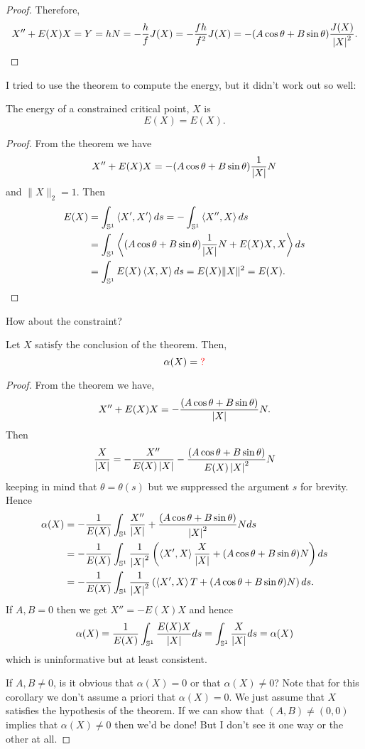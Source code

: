 \documentclass[12pt]{article}
\begin{document}
\begin{proof}
Therefore,
\[
X'' + E(X) X = Y = hN = -\frac{h}{f} J(X) = -\frac{fh}{f^2} J(X) = -(A \cos\theta + B \sin\theta) \frac{J(X)}{\left|{X}\right|^2}.
\]
\end{proof}

{\color{red} I tried to use the theorem to compute the energy, but it didn't work out so well:}

\begin{cor}
The energy of a constrained critical point, \(X\) is
\[
E(X) = E(X).
\]
\end{cor}

\begin{proof}
From the theorem we have
\[
X'' + E(X) X = -(A \cos\theta + B \sin\theta) \frac{1}{\left|{X}\right|} N
\]
and \(\|X\|_2 = 1\). Then
\[
\begin{split}
E(X) &= \int_{\operatorname{\mathbb{S}^1}} \left\langle{X'},{X'}\right\rangle ds = -\int_{\operatorname{\mathbb{S}^1}} \left\langle{X''},{X}\right\rangle ds \\
&= \int_{\operatorname{\mathbb{S}^1}} \left\langle{(A \cos\theta + B \sin\theta) \frac{1}{\left|{X}\right|} N + E(X) X},{X}\right\rangle ds \\
&= \int_{\operatorname{\mathbb{S}^1}} E(X) \left\langle{X},{X}\right\rangle ds = E(X) \|X\|^2 = E(X).
\end{split}
\]
\end{proof}

{\color{red} How about the constraint?}

\begin{cor}
Let \(X\) satisfy the conclusion of the theorem. Then,
\[
\alpha(X) = {\color{red} ?}
\]
\end{cor}

\begin{proof}
From the theorem we have,
\[
X'' + E(X) X = -\frac{(A \cos\theta + B \sin\theta)}{\left|{X}\right|} N.
\]
Then
\[
\frac{X}{\left|{X}\right|} = -\frac{X''}{E(X)\left|{X}\right|} - \frac{(A \cos\theta + B \sin\theta)}{E(X)\left|{X}\right|^2} N
\]
keeping in mind that \(\theta = \theta(s)\) but we suppressed the argument \(s\) for brevity. Hence
\[
\begin{split}
\alpha(X) &= -\frac{1}{E(X)} \int_{\operatorname{\mathbb{S}^1}} \frac{X''}{\left|{X}\right|} +  \frac{(A \cos\theta + B \sin\theta)}{\left|{X}\right|^2} N ds \\
&= -\frac{1}{E(X)} \int_{\operatorname{\mathbb{S}^1}} \frac{1}{\left|{X}\right|^2} \left(\left\langle{X'},{X}\right\rangle \frac{X}{\left|{X}\right|} + (A \cos\theta + B \sin\theta) N\right) ds \\
&= -\frac{1}{E(X)} \int_{\operatorname{\mathbb{S}^1}} \frac{1}{\left|{X}\right|^2} \left(\left\langle{X'},{X}\right\rangle T + (A \cos\theta + B \sin\theta) N\right) ds.
\end{split}
\]
If \(A, B = 0\) then we get \(X'' = -E(X) X\) and hence
\[
\alpha(X) = \frac{1}{E(X)} \int_{\operatorname{\mathbb{S}^1}} \frac{E(X)X}{\left|{X}\right|} ds = \int_{\operatorname{\mathbb{S}^1}} \frac{X}{\left|{X}\right|} ds = \alpha(X)
\]
which is uninformative but at least consistent.

{\color{red} If \(A, B \ne 0\), is it obvious that \(\alpha(X) = 0\) or that \(\alpha(X) \ne 0\)? Note that for this corollary we don't assume a priori that \(\alpha(X) = 0\). We just assume that \(X\) satisfies the hypothesis of the theorem. If we can show that \((A, B) \ne (0, 0)\) implies that \(\alpha(X) \ne 0\) then we'd be done! But I don't see it one way or the other at all.}
\end{proof}
\end{document}
